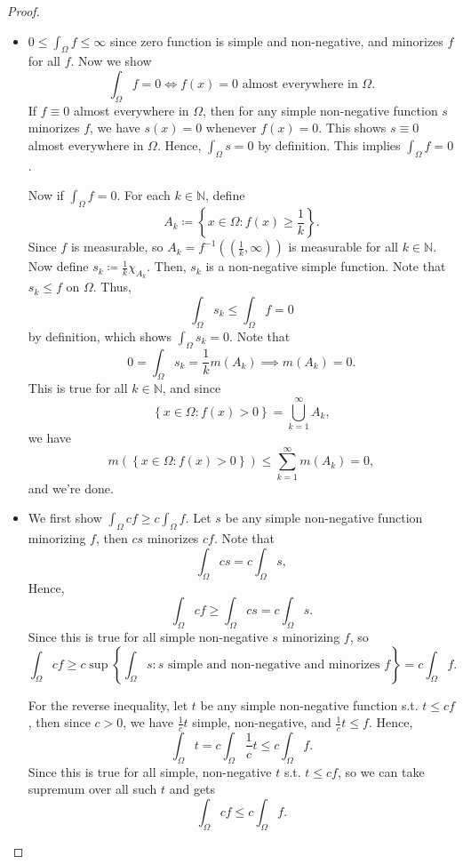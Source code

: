 \begin{proof}
\hfill
    \begin{itemize}
    \item [(a)] \(0 \le \int _\Omega f \le \infty\) since zero function is simple and non-negative, and minorizes \(f\) for all \(f\). Now we show 
    \[
        \int _\Omega f = 0 \iff f(x) = 0 \text{ almost everywhere in } \Omega. 
    \]
    If \(f \equiv 0\) almost everywhere in \(\Omega\), then for any simple non-negative function \(s\) minorizes \(f\), we have \(s(x) = 0\) whenever \(f(x) = 0\). This shows \(s \equiv 0\) almost everywhere in \(\Omega\). Hence, \(\int _\Omega s = 0\) by definition. This implies \(\int _\Omega f = 0\).   

    Now if \(\int _\Omega f = 0\). For each \(k \in \mathbb{N}\), define 
    \[
        A_k \coloneqq \left\{ x \in \Omega : f(x) \ge \frac{1}{k} \right\}. 
    \]         
    Since \(f\) is measurable, so \(A_k = f^{-1}\left( \left( \frac{1}{k}, \infty \right)  \right) \) is measurable for all \(k \in \mathbb{N}\). Now define \(s_k \coloneqq \frac{1}{k} \chi _{A_k}\). Then, \(s_k\) is a non-negative simple function. Note that \(s_k \le f\) on \(\Omega\). Thus, 
    \[
        \int _\Omega s_k \le \int _\Omega f = 0
    \]      
    by definition, which shows \(\int _\Omega s_k = 0\). Note that 
    \[
        0 = \int _\Omega s_k = \frac{1}{k} m(A_k) \implies m(A_k) = 0.
    \] 
    This is true for all \(k \in \mathbb{N}\), and since 
    \[
        \left\{ x \in \Omega : f(x) > 0 \right\} = \bigcup_{k=1}^{\infty} A_k, 
    \] 
    we have 
    \[
        m(\left\{ x \in \Omega : f(x) > 0 \right\} ) \le \sum_{k=1}^{\infty} m(A_k) = 0, 
    \]
    and we're done.

    \item [(b)] We first show \(\int _\Omega cf \ge c \int _\Omega f\). Let \(s\) be any simple non-negative function minorizing \(f\), then \(cs\) minorizes \(cf\). Note that 
    \[
        \int _\Omega cs = c \int _\Omega s,
    \]
    Hence,
    \[
        \int _\Omega cf \ge \int _\Omega cs = c \int _\Omega s.
    \]
    Since this is true for all simple non-negative \(s\) minorizing \(f\), so 
    \[
        \int _\Omega cf \ge c \sup \left\{ \int _\Omega s: s \text{ simple and non-negative and minorizes } f  \right\} = c \int _\Omega f.  
    \]  

    For the reverse inequality, let \(t\) be any simple non-negative function s.t. \(t \le cf\), then since \(c > 0\), we have \(\frac{1}{c} t\) simple, non-negative, and \(\frac{1}{c} t \le f\). Hence,
    \[
        \int _\Omega t = c \int _\Omega \frac{1}{c} t \le c \int _\Omega f. 
    \]      
    Since this is true for all simple, non-negative \(t\) s.t. \(t \le cf\), so we can take supremum over all such \(t\) and gets
    \[
        \int _\Omega cf \le c \int _\Omega f.
    \]   


\end{itemize}
\end{proof}
